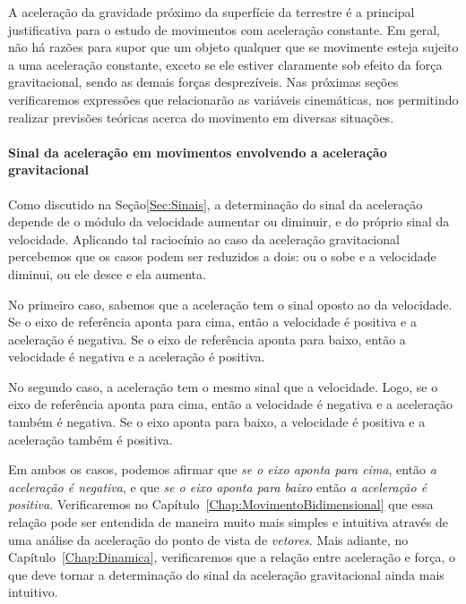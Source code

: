A aceleração da gravidade próximo da superfície da terrestre é a principal justificativa para o estudo de movimentos com aceleração constante. Em geral, não há razões para supor que um objeto qualquer que se movimente esteja sujeito a uma aceleração constante, exceto se ele estiver claramente sob efeito da força gravitacional, sendo as demais forças desprezíveis. Nas próximas seções verificaremos expressões que relacionarão as variáveis cinemáticas, nos permitindo realizar previsões teóricas acerca do movimento em diversas situações.

\paragraph{Sinal da aceleração em movimentos envolvendo a aceleração gravitacional}

Como discutido na Seção\ref{Sec:Sinais}, a determinação do sinal da aceleração depende de o módulo da velocidade aumentar ou diminuir, e do próprio sinal da velocidade. Aplicando tal raciocínio ao caso da aceleração gravitacional percebemos que os casos podem ser reduzidos a dois: ou o sobe e a velocidade diminui, ou ele desce e ela aumenta. 

No primeiro caso, sabemos que a aceleração tem o sinal oposto ao da velocidade. Se o eixo de referência aponta para cima, então a velocidade é positiva e a aceleração é negativa. Se o eixo de referência aponta para baixo, então a velocidade é negativa e a aceleração é positiva.

No segundo caso, a aceleração tem o mesmo sinal que a velocidade. Logo, se o eixo de referência aponta para cima, então a velocidade é negativa e a aceleração também é negativa. Se o eixo aponta para baixo, a velocidade é positiva e a aceleração também é positiva.

Em ambos os casos, podemos afirmar que \emph{se o eixo aponta para cima}, então \emph{a aceleração é negativa}, e que \emph{se o eixo aponta para baixo} então \emph{a aceleração é positiva}. Verificaremos no Capítulo~\ref{Chap:MovimentoBidimensional} que essa relação pode ser entendida de maneira muito mais simples e intuitiva através de uma análise da aceleração do ponto de vista de \emph{vetores}. Mais adiante, no Capítulo~\ref{Chap:Dinamica}, verificaremos que a relação entre aceleração e força, o que deve tornar a determinação do sinal da aceleração gravitacional ainda mais intuitivo.

